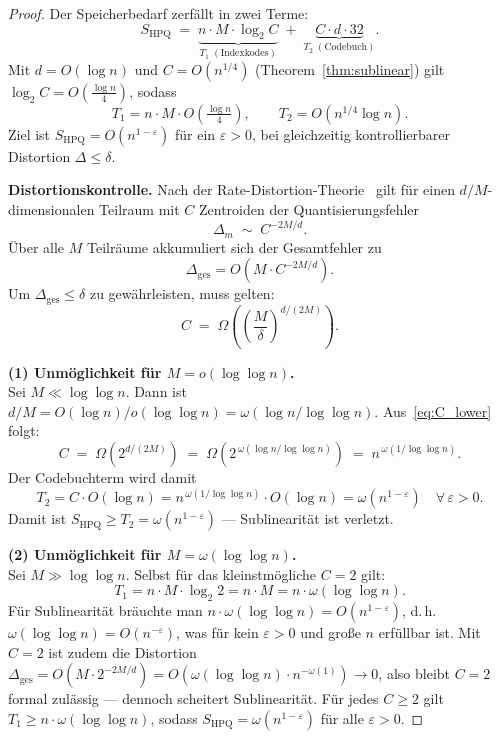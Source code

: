 ﻿\documentclass[12pt,a4paper]{article}
\begin{document}
\begin{proof}
Der Speicherbedarf zerfällt in zwei Terme:
\begin{equation}
  S_{\mathrm{HPQ}} 
  \;=\; \underbrace{n \cdot M \cdot \log_2 C}_{\displaystyle T_1\;(\text{Indexkodes})}
  \;+\; \underbrace{C \cdot d \cdot 32}_{\displaystyle T_2\;(\text{Codebuch})}.
  \label{eq:split}
\end{equation}
Mit $d = O(\log n)$ und $C = O(n^{1/4})$ (Theorem~\ref{thm:sublinear}) gilt 
$\log_2 C = O(\frac{\log n}{4})$, sodass
\[
  T_1 = n \cdot M \cdot O\!\left(\tfrac{\log n}{4}\right), \qquad
  T_2 = O\!\left(n^{1/4}\log n\right).
\]
Ziel ist $S_{\mathrm{HPQ}} = O(n^{1-\varepsilon})$ für ein $\varepsilon > 0$,
bei gleichzeitig kontrollierbarer Distortion $\Delta \leq \delta$.

\medskip
\textbf{Distortionskontrolle.}
Nach der Rate-Distortion-Theorie~\cite{berger1971ratedistortion} gilt 
für einen $d/M$-dimensionalen Teilraum mit $C$ Zentroiden der 
Quantisierungsfehler
\[
  \Delta_m \;\sim\; C^{-2M/d}.
\]
Über alle $M$ Teilräume akkumuliert sich der Gesamtfehler zu
\[
  \Delta_{\mathrm{ges}} = O\!\left(M \cdot C^{-2M/d}\right).
\]
Um $\Delta_{\mathrm{ges}} \leq \delta$ zu gewährleisten, muss gelten:
\begin{equation}
  C \;=\; \Omega\!\left(\!\left(\frac{M}{\delta}\right)^{d/(2M)}\right).
  \label{eq:C_lower}
\end{equation}

\medskip
\textbf{(1) Unmöglichkeit für $M = o(\log\log n)$.}\\
Sei $M \ll \log\log n$. Dann ist $d/M = O(\log n)/o(\log\log n) 
= \omega(\log n/\log\log n)$.
Aus~\eqref{eq:C_lower} folgt:
\[
  C \;=\; \Omega\!\left(2^{d/(2M)}\right) 
  \;=\; \Omega\!\left(2^{\,\omega(\log n / \log\log n)}\right)
  \;=\; n^{\,\omega(1/\log\log n)}.
\]
Der Codebuchterm wird damit
\[
  T_2 = C \cdot O(\log n) 
      = n^{\,\omega(1/\log\log n)} \cdot O(\log n)
      = \omega\!\left(n^{1-\varepsilon}\right)
      \quad \forall\,\varepsilon > 0.
\]
Damit ist $S_{\mathrm{HPQ}} \geq T_2 = \omega(n^{1-\varepsilon})$ --- 
Sublinearität ist verletzt.

\medskip
\textbf{(2) Unmöglichkeit für $M = \omega(\log\log n)$.}\\
Sei $M \gg \log\log n$. Selbst für das kleinstmögliche $C = 2$ gilt:
\[
  T_1 = n \cdot M \cdot \log_2 2 = n \cdot M = n \cdot \omega(\log\log n).
\]
Für Sublinearität bräuchte man $n\cdot\omega(\log\log n) = O(n^{1-\varepsilon})$, 
d.\,h. $\omega(\log\log n) = O(n^{-\varepsilon})$, was für kein 
$\varepsilon > 0$ und große $n$ erfüllbar ist. Mit $C = 2$ ist zudem 
die Distortion $\Delta_{\mathrm{ges}} = O(M \cdot 2^{-2M/d}) 
= O(\omega(\log\log n) \cdot n^{-\omega(1)}) \to 0$, also bleibt 
$C = 2$ formal zulässig --- dennoch scheitert Sublinearität.
Für jedes $C \geq 2$ gilt $T_1 \geq n \cdot \omega(\log\log n)$, 
sodass $S_{\mathrm{HPQ}} = \omega(n^{1-\varepsilon})$ für alle $\varepsilon > 0$.


\end{proof}
\end{document}
